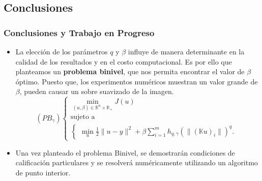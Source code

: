 \documentclass{beamer}
\begin{document}
\begin{frame}
\section{Conclusiones}
\frametitle{Conclusiones y Trabajo en Progreso}
\begin{itemize}
    \justifying
        \item La elección de los parámetros $q$ y $\beta$ influye de manera determinante en la calidad de los resultados y en el costo computacional. Es por ello que planteamos un \textbf{problema binivel}, que 
   nos permita encontrar el valor de $\beta$ óptimo. Puesto que, los experimentos numéricos muestran un valor grande de $\beta$, pueden causar un sobre suavizado de la imagen. 
 \begin{equation*}
    (PB_{\gamma}) \left\{\begin{array}{l}
        \displaystyle \min_{(u,\beta)\in \mathbb{R}^n\times \mathbb{R}_+}  J(u) \\
        \text{sujeto a}                                                             \\
        \left\{\begin{array}{l}
                   \displaystyle \min_{u} \frac{1}{2}\|u-y\|^2+\beta \sum_{i=1}^m h_{q,\gamma}(\|(\mathbb{K}u)_i\|)^q.
               \end{array}\right.
    \end{array}\right.
\end{equation*}
   \item Una vez planteado el problema Binivel, se demostrarán condiciones de calificación particulares y se resolverá numéricamente utilizando un algoritmo de punto interior. 
\end{itemize}
\end{frame}
\end{document}
